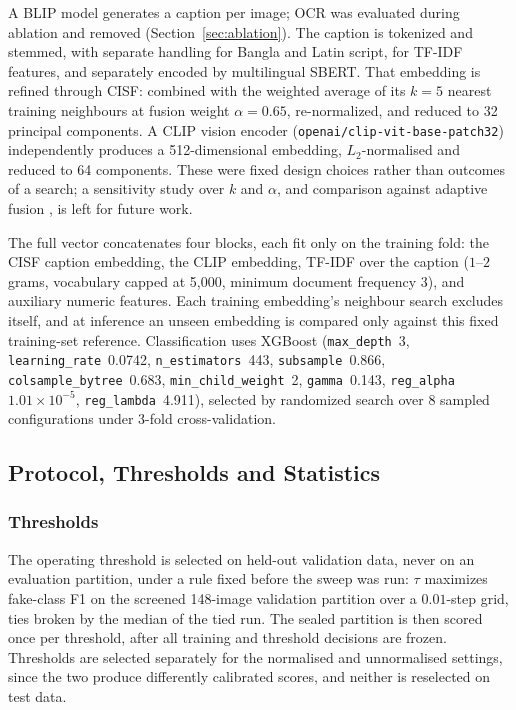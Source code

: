 A BLIP model generates a caption per image; OCR was evaluated during ablation
and removed (Section~\ref{sec:ablation}). The caption is tokenized and stemmed,
with separate handling for Bangla and Latin script, for TF-IDF features, and
separately encoded by multilingual SBERT. That embedding is refined through
CISF: combined with the weighted average of its $k=5$ nearest training
neighbours at fusion weight $\alpha=0.65$, re-normalized, and reduced to 32
principal components. A CLIP vision encoder
(\texttt{openai/clip-vit-base-patch32}) independently produces a
512-dimensional embedding, $L_2$-normalised and reduced to 64 components. These
were fixed design choices rather than outcomes of a search; a sensitivity study
over $k$ and $\alpha$, and comparison against adaptive fusion
\cite{mmfusionnet,claaf}, is left for future work.

The full vector concatenates four blocks, each fit only on the training fold:
the CISF caption embedding, the CLIP embedding, TF-IDF over the caption
($1$--$2$ grams, vocabulary capped at 5{,}000, minimum document frequency 3),
and auxiliary numeric features. Each training embedding's neighbour search
excludes itself, and at inference an unseen embedding is compared only against
this fixed training-set reference. Classification uses XGBoost
(\texttt{max\_depth}~3, \texttt{learning\_rate}~0.0742,
\texttt{n\_estimators}~443, \texttt{subsample}~0.866,
\texttt{colsample\_bytree}~0.683, \texttt{min\_child\_weight}~2,
\texttt{gamma}~0.143, \texttt{reg\_alpha}~$1.01\times10^{-5}$,
\texttt{reg\_lambda}~4.911), selected by randomized search over 8 sampled
configurations under 3-fold cross-validation.

\subsection{Protocol, Thresholds and Statistics}
\label{sec:training}

\subsubsection{Thresholds}
The operating threshold is selected on held-out validation data, never on an
evaluation partition, under a rule fixed before the sweep was run: $\tau$
maximizes fake-class F1 on the screened 148-image validation partition over a
$0.01$-step grid, ties broken by the median of the tied run. The sealed
partition is then scored once per threshold, after all training and threshold
decisions are frozen. Thresholds are selected separately for the normalised and
unnormalised settings, since the two produce differently calibrated scores, and
neither is reselected on test data.

